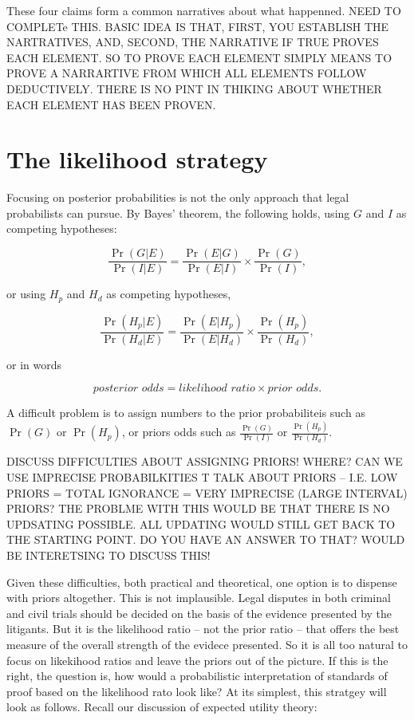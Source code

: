 \documentclass[10pt,dvipsnames,enabledeprecatedfontcommands]{scrartcl}
\begin{document}
\noindent
These four claims form a common narratives about what happenned. NEED TO
COMPLETe THIS. BASIC IDEA IS THAT, FIRST, YOU ESTABLISH THE NARTRATIVES,
AND, SECOND, THE NARRATIVE IF TRUE PROVES EACH ELEMENT. SO TO PROVE EACH
ELEMENT SIMPLY MEANS TO PROVE A NARRARTIVE FROM WHICH ALL ELEMENTS
FOLLOW DEDUCTIVELY. THERE IS NO PINT IN THIKING ABOUT WHETHER EACH
ELEMENT HAS BEEN PROVEN.

\section{The likelihood strategy}\label{the-likelihood-strategy}

Focusing on posterior probabilities is not the only approach that legal
probabilists can pursue. By Bayes' theorem, the following holds, using
\(G\) and \(I\) as competing hypotheses:

\[ \frac{\Pr(G | E)}{\Pr(I | E)} = \frac{\Pr(E | G)}{\Pr(E | I)} \times \frac{\Pr(G)}{\Pr(I)},\]

or using \(H_p\) and \(H_d\) as competing hypotheses,

\[ \frac{\Pr(H_p | E)}{\Pr(H_d | E)} = \frac{\Pr(E | H_p)}{\Pr(E | H_d)} \times \frac{\Pr(H_p)}{\Pr(H_d)},\]

or in words

\[ \textit{posterior odds} = \textit{likelihood ratio} \times \textit{prior odds}.\]

A difficult problem is to assign numbers to the prior probabiliteis such
as \(\Pr(G)\) or \(\Pr(H_p)\), or priors odds such as
\(\frac{\Pr(G)}{\Pr(I)}\) or \(\frac{\Pr(H_p)}{\Pr(H_d)}\).

DISCUSS DIFFICULTIES ABOUT ASSIGNING PRIORS! WHERE? CAN WE USE IMPRECISE
PROBABILKITIES T TALK ABOUT PRIORS -- I.E. LOW PRIORS = TOTAL IGNORANCE
= VERY IMPRECISE (LARGE INTERVAL) PRIORS? THE PROBLME WITH THIS WOULD BE
THAT THERE IS NO UPDSATING POSSIBLE. ALL UPDATING WOULD STILL GET BACK
TO THE STARTING POINT. DO YOU HAVE AN ANSWER TO THAT? WOULD BE
INTERETSING TO DISCUSS THIS!

Given these difficulties, both practical and theoretical, one option is
to dispense with priors altogether. This is not implausible. Legal
disputes in both criminal and civil trials should be decided on the
basis of the evidence presented by the litigants. But it is the
likelihood ratio -- not the prior ratio -- that offers the best measure
of the overall strength of the evidece presented. So it is all too
natural to focus on likekihood ratios and leave the priors out of the
picture. If this is the right, the question is, how would a
probabilistic interpretation of standards of proof based on the
likelihood rato look like? At its simplest, this stratgey will look as
follows. Recall our discussion of expected utility theory:
\end{document}

